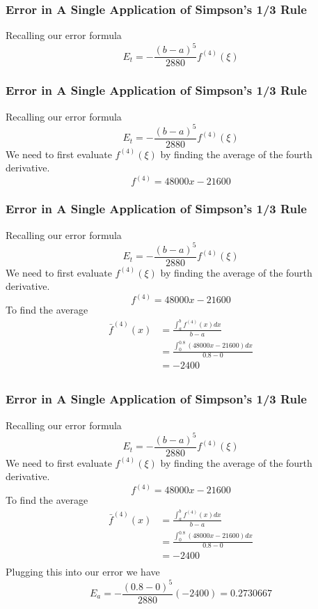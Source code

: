 \documentclass{if-beamer}
\begin{document}
\begin{frame}[t]
	\frametitle{Error in A Single Application of Simpson’s 1/3 Rule}
	Recalling our error formula
	$$E_t = -\frac{(b-a)^5}{2880}f^{(4)}(\xi)$$

\end{frame}

\begin{frame}[t]
	\frametitle{Error in A Single Application of Simpson’s 1/3 Rule}
	Recalling our error formula
	$$E_t = -\frac{(b-a)^5}{2880}f^{(4)}(\xi)$$
	We need to first evaluate $f^{(4)}(\xi)$ by finding the average of the fourth derivative.
	$$f^{(4)} = 48000x-21600$$
\end{frame}

\begin{frame}[t]
	\frametitle{Error in A Single Application of Simpson’s 1/3 Rule}
	Recalling our error formula
	$$E_t = -\frac{(b-a)^5}{2880}f^{(4)}(\xi)$$
	We need to first evaluate $f^{(4)}(\xi)$ by finding the average of the fourth derivative.
	$$f^{(4)} = 48000x-21600$$
	To find the average
	\begin{align*}
		\bar{f}^{(4)}(x) &= \frac{\int_{a}^{b}f^{(4)}(x)dx}{b-a}\\
		&= \frac{\int_{0}^{0.8}(48000x-21600)dx}{0.8-0}\\
		&= -2400\\
	\end{align*}
\end{frame}

\begin{frame}[t]
	\frametitle{Error in A Single Application of Simpson’s 1/3 Rule}
	Recalling our error formula
	$$E_t = -\frac{(b-a)^5}{2880}f^{(4)}(\xi)$$
	We need to first evaluate $f^{(4)}(\xi)$ by finding the average of the fourth derivative.
	$$f^{(4)} = 48000x-21600$$
	To find the average
	\begin{align*}
		\bar{f}^{(4)}(x) &= \frac{\int_{a}^{b}f^{(4)}(x)dx}{b-a}\\
		&= \frac{\int_{0}^{0.8}(48000x-21600)dx}{0.8-0}\\
		&= -2400\\
	\end{align*}
	Plugging this into our error we have
	$$E_a = -\frac{(0.8-0)^5}{2880}(-2400) = 0.2730667$$
\end{frame}
\end{document}
